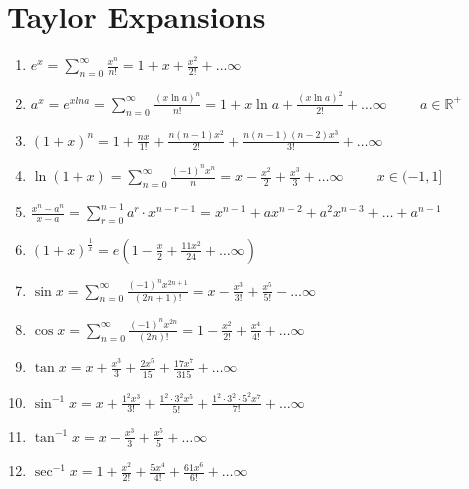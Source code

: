 \documentclass{article}
\begin{document}
\section{Taylor Expansions}
\begin{enumerate}
    \item $e^x=\displaystyle\sum_{n=0}^{\infty} \frac{x^n}{n!}=1+x+\frac{x^2}{2!}+ \ldots \infty$
    \item $a^x=e^{xlna}=\displaystyle\sum_{n=0}^{\infty} \frac{{\left(x \ln a\right)^n}}{n!}=1+x \ln a + \frac{\left(x \ln a \right)^2}{2!}+ \ldots \infty \hspace{1cm} a \in \mathbb{R^+}$
    \item $\left(1+x\right)^n=1+\frac{nx}{1!}+\frac{n\left(n-1\right)x^2}{2!}+\frac{n\left(n-1\right)\left(n-2\right)x^3}{3!}+ \ldots \infty$
    \item $\ln \left(1+x\right)=\displaystyle\sum_{n=0}^{\infty} \frac{\left(-1\right)^nx^n}{n}=x-\frac{x^2}{2}+\frac{x^3}{3} +\ldots \infty \hspace{1cm} x \in (-1,1]$
    \item $\frac{x^n-a^n}{x-a}=\displaystyle\sum_{r=0}^{n-1} a^r \cdot x^{n-r-1}=x^{n-1}+ax^{n-2}+a^2x^{n-3}+\ldots +a^{n-1}$

    \item $\left(1+x\right)^\frac{1}{x}=e\left(1-\frac{x}{2}+\frac{11x^2}{24}+ \ldots \infty\right)$

    \item $\sin x=\displaystyle\sum_{n=0}^{\infty} \frac{\left(-1\right)^nx^{2n+1}}{(2n+1)!}=x-\frac{x^3}{3!}+\frac{x^5}{5!}- \ldots \infty$

    \item $\cos x = \displaystyle\sum_{n=0}^{\infty} \frac{\left(-1\right)^nx^{2n}}{(2n)!}=1-\frac{x^2}{2!}+\frac{x^4}{4!}+ \ldots \infty$

    \item $\tan x=x+\frac{x^3}{3}+\frac{2x^5}{15}+\frac{17x^7}{315}+\ldots \infty$

    \item $\sin^{-1} x=x+\frac{1^2x^3}{3!}+\frac{1^2 \cdot 3^2x^5}{5!}+\frac{1^2 \cdot 3^2 \cdot 5^2 x^7}{7!}+ \ldots \infty$

    \item $\tan^{-1} x = x- \frac{x^3}{3}+\frac{x^5}{5}+\ldots \infty$

    \item $\sec^{-1} x=1+\frac{x^2}{2!}+\frac{5x^4}{4!}+\frac{61x^6}{6!}+\ldots \infty$


\end{enumerate}
\end{document}
